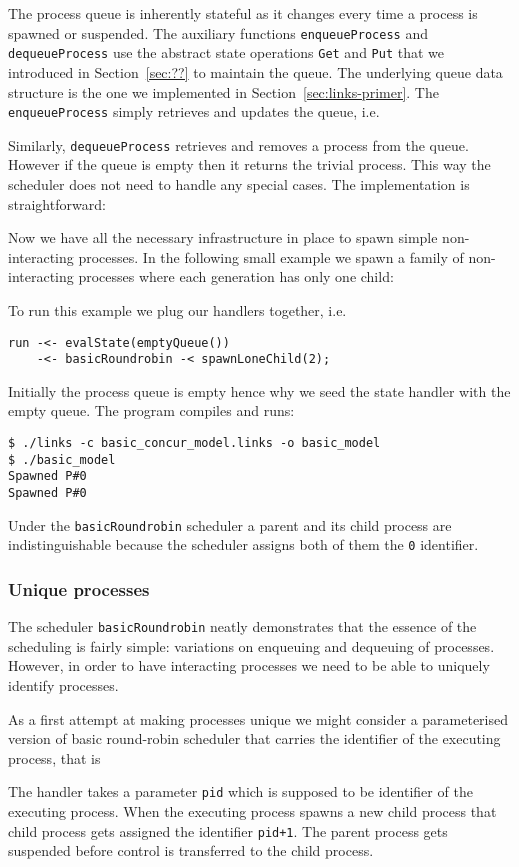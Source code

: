 \documentclass[12pt,mscres,cdtppar,twoside,openright,logo,rightchapter,normalheadings]{infthesis}
\newcommand{\snippet}[1]{}
\theoremstyle{definition}
\begin{document}
The process queue is inherently stateful as it changes every time a
process is spawned or suspended.  The auxiliary functions
\lstinline$enqueueProcess$ and \lstinline$dequeueProcess$ use the
abstract state operations \lstinline$Get$ and \lstinline$Put$ that we
introduced in Section~\ref{sec:??} to maintain the queue. The
underlying queue data structure is the one we implemented in
Section~\ref{sec:links-primer}. The \lstinline$enqueueProcess$ simply
retrieves and updates the queue, i.e.
%
\snippet{enqueueProcess.links}
%
Similarly, \lstinline$dequeueProcess$ retrieves and removes a process
from the queue. However if the queue is empty then it returns the
trivial process. This way the scheduler does not need to handle any
special cases. The implementation is straightforward:
%
\snippet{dequeueProcess.links}
%
Now we have all the necessary infrastructure in place to spawn simple
non-interacting processes. In the following small example we spawn a
family of non-interacting processes where each generation has only one
child:
%
\snippet{spawnLoneChild.links}
%
To run this example we plug our handlers together, i.e.
%
\begin{lstlisting}
run -<- evalState(emptyQueue()) 
    -<- basicRoundrobin -< spawnLoneChild(2);
\end{lstlisting}
%
Initially the process queue is empty hence why we seed the state
handler with the empty queue. The program compiles and runs:
%
\begin{lstlisting}[style=terminal]
$ ./links -c basic_concur_model.links -o basic_model
$ ./basic_model
Spawned P#0
Spawned P#0
\end{lstlisting}
%
Under the \lstinline$basicRoundrobin$ scheduler a parent and its child
process are indistinguishable because the scheduler assigns both of
them the \lstinline$0$ identifier.

\subsubsection{Unique processes}

The scheduler \lstinline$basicRoundrobin$ neatly demonstrates that the
essence of the scheduling is fairly simple: variations on enqueuing
and dequeuing of processes. However, in order to have interacting
processes we need to be able to uniquely identify processes. 

As a first attempt at making processes unique we might consider a
parameterised version of basic round-robin scheduler that carries the
identifier of the executing process, that is
%
\snippet{wrongRoundrobin.links}
%
The handler takes a parameter \lstinline$pid$ which is supposed to be
identifier of the executing process. When the executing process spawns
a new child process that child process gets assigned the identifier
\lstinline$pid+1$. The parent process gets suspended before control is
transferred to the child process. 
\end{document}
